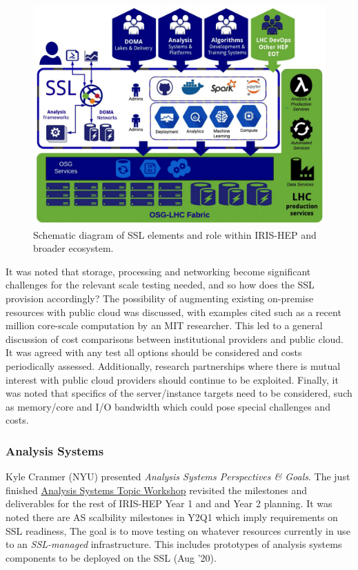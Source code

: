 \documentclass[11pt,letterpaper,fleqn]{article}
\begin{document}
\begin{figure}[ht!]
  \centering
  \includegraphics[width=0.99\linewidth]{figures/ssl.png}
  \vspace{-0.3cm}
  \caption{Schematic diagram of SSL elements and role within IRIS-HEP and broader ecosystem.}
  \label{fig:ssl}
\end{figure}

It was noted that storage, processing and networking become significant challenges for the relevant scale testing needed, and so how does the SSL provision accordingly? The possibility of augmenting existing on-premise resources with public cloud was discussed, with examples cited such as a recent million core-scale computation by an MIT researcher.  This led to a general discussion of cost comparisons between institutional providers and public cloud. It was agreed with any test all options should be considered and costs periodically assessed.  Additionally, research partnerships where there is mutual interest with public cloud providers should continue to be exploited.  Finally, it was noted that specifics of the server/instance targets need to be considered, such as memory/core and I/O bandwidth which could pose special challenges and costs.

\subsubsection{Analysis Systems}
\vspace{0.2cm}
Kyle Cranmer (NYU) presented {\it Analysis Systems Perspectives \& Goals}.  The just finished \href{https://indico.cern.ch/event/822074/}{Analysis Systems Topic Workshop} revisited the milestones and deliverables for the rest of IRIS-HEP Year 1 and and Year 2 planning.  It was noted there are AS scalbility milestones in Y2Q1 which imply requirements on SSL readiness,  The goal is to move testing on whatever resources currently in use to an {\it SSL-managed} infrastructure.
This includes prototypes of analysis systems components to be deployed on the SSL (Aug '20).
\end{document}
